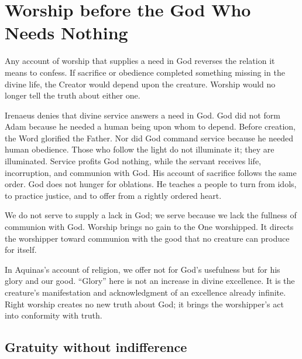 \section{Worship before the God Who Needs Nothing}

Any account of worship that supplies a need in God reverses the relation it means to confess. If sacrifice or obedience completed something missing in the divine life, the Creator would depend upon the creature. Worship would no longer tell the truth about either one.

Irenaeus denies that divine service answers a need in God. God did not form Adam because he needed a human being upon whom to depend. Before creation, the Word glorified the Father. Nor did God command service because he needed human obedience. Those who follow the light do not illuminate it; they are illuminated. Service profits God nothing, while the servant receives life, incorruption, and communion with God. His account of sacrifice follows the same order. God does not hunger for oblations. He teaches a people to turn from idols, to practice justice, and to offer from a rightly ordered heart.

We do not serve to supply a lack in God; we serve because we lack the fullness of communion with God. Worship brings no gain to the One worshipped. It directs the worshipper toward communion with the good that no creature can produce for itself.

In Aquinas's account of religion, we offer not for God's usefulness but for his glory and our good. ``Glory'' here is not an increase in divine excellence. It is the creature's manifestation and acknowledgment of an excellence already infinite. Right worship creates no new truth about God; it brings the worshipper's act into conformity with truth.

\subsection{Gratuity without indifference}

